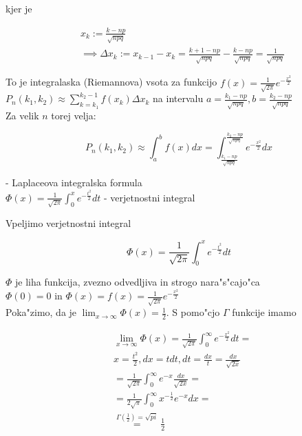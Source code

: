 \documentclass[a4paper,12pt]{article}
\theoremstyle{definition}
\theoremstyle{remark}
\begin{document}
kjer je

\begin{align*}
    &x_k := \frac{k-np}{\sqrt{npq}} \\
    &\implies \Delta x_k := x_{k-1} - x_k = \frac{k+1-np}{\sqrt{npq}} - \frac{k-np}{\sqrt{npq}} =
        \frac{1}{\sqrt{npq}}
\end{align*}

To je integralaska (Riemannova) vsota za funkcijo $f(x) = \frac{1}{\sqrt{2\pi}} e^{-\frac{x^2}{2}}$ \\
$P_n(k_1, k_2) \approx \sum_{k=k_1}^{k_2-1} f(x_k) \Delta x_k$ na intervalu $a = \frac{k_1-np}{\sqrt{npq}},
b = \frac{k_2-np}{\sqrt{npq}}$ \\
Za velik $n$ torej velja:

\begin{equation*}
    P_n(k_1, k_2) \approx \int_a^b f(x) dx = \int_{\frac{k_1-np}{\sqrt{npq}}}^{\frac{k_2-np}{\sqrt{npq}}}
    e^{-\frac{x^2}{2}} dx
\end{equation*}

- Laplaceova integralska formula \\
$\Phi(x) = \frac{1}{\sqrt{2\pi}} \int_0^x e^{-\frac{t^2}{2}} dt$ - verjetnostni integral




Vpeljimo verjetnostni integral

\begin{equation*}
    \Phi(x) = \frac{1}{\sqrt{2\pi}} \int_0^x e^{-\frac{t^2}{2}} dt
\end{equation*}

$\Phi$ je liha funkcija, zvezno odvedljiva in strogo nara"s"cajo"ca \\
$\Phi(0) = 0$ in $\Phi(x) = f(x) = \frac{1}{\sqrt{2\pi}} e^{-\frac{x^2}{2}}$ \\
Poka"zimo, da je $\lim_{x \to \infty} \Phi(x) = \frac{1}{2}$. S pomo"cjo $\Gamma$ funkcije imamo

\begin{align*}
    &\lim_{x \to \infty} \Phi(x) = \frac{1}{\sqrt{2\pi}} \int_{0}^{\infty} e^{-\frac{x^2}{2}} dt = \\
    &x = \frac{t^2}{2}, dx = t dt, dt = \frac{dx}{t} = \frac{dx}{\sqrt{2x}} \\
    &= \frac{1}{\sqrt{2\pi}} \int_{0}^{\infty} e^{-x} \frac{dx}{\sqrt{2x}} = \\
    &= \frac{1}{2\sqrt{\pi}} \int_{0}^{\infty} x^{-\frac{1}{2}} e^{-x} dx = \\
    &\stackrel{\Gamma(\frac{1}{2}) = \sqrt{pi}}{=} \frac{1}{2}
\end{align*}
\end{document}
